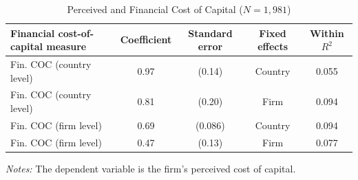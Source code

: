 \begin{table}[htbp]
    \centering
    \caption{Perceived and Financial Cost of Capital
    (\(N = 1{,}981\))}
    \label{tab:perceived_financial_coc}
    \begin{tabular}{lcccc}
        \toprule
        Financial cost-of-capital measure
            & Coefficient
            & Standard error
            & Fixed effects
            & Within \(R^2\) \\
        \midrule
        Fin. COC (country level)
            & 0.97
            & (0.14)
            & Country
            & 0.055 \\

        Fin. COC (country level)
            & 0.81
            & (0.20)
            & Firm
            & 0.094 \\

        Fin. COC (firm level)
            & 0.69
            & (0.086)
            & Country
            & 0.094 \\

        Fin. COC (firm level)
            & 0.47
            & (0.13)
            & Firm
            & 0.077 \\
        \bottomrule
    \end{tabular}

    \begin{minipage}{0.92\linewidth}
        \footnotesize
        \vspace{0.5em}
        \textit{Notes:} The dependent variable is the firm's perceived
        cost of capital.
    \end{minipage}
\end{table}